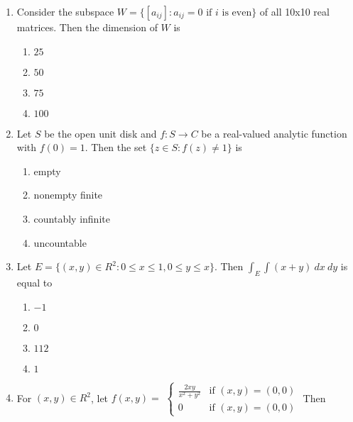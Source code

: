 \documentclass[journal]{IEEEtran}
\begin{document}
\begin{enumerate}
    

\item {Consider the subspace $W=\{[a_{ij}]: a_{ij}=0 \text{ if } i \text{ is even}\}$ of all 10x10 real matrices. Then the dimension of $W$ is

\begin{multicols}{4}
    \begin{enumerate}
        \item $25$
        \item $50$
        \item $75$
        \item $100$
    \end{enumerate}
\end{multicols}}

\item { Let $S$ be the open unit disk and $f: S\rightarrow C$ be a real-valued analytic function with $f(0) = 1$. Then the set $\{z \in S: f(z) \ne 1\}$ is

\begin{multicols}{2}
    \begin{enumerate}
        \item{empty}
        \item{nonempty finite }
        \item{countably infinite}
        \item{uncountable}
    \end{enumerate}
\end{multicols}
}

\item{ Let $E=\{(x,y)\in R^2:0\leq x\leq1,0\leq y\leq x\}$. Then $\int_E\int(x+y) \: dx \: dy$ is equal to
\begin{multicols}{4}
\begin{enumerate}
    \item $-1$
    \item $0$
    \item $112$
    \item $1$
\end{enumerate}
\end{multicols}
}

\item {
For $(x, y) \in R^2$, let
$f(x,y) =$ $\begin{cases}\frac{2xy}{x^2+y^2} & \text{if } (x,y)=(0,0)\\
    0 & \text{if } (x, y)=(0,0)
\end{cases}$
Then

}
\end{enumerate}
\end{document}
